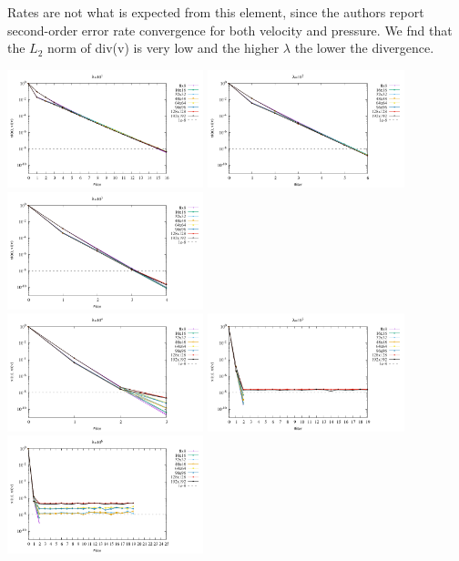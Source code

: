 Rates are not what is expected from this element, since the authors report 
second-order error rate convergence for both velocity and pressure.
We fnd that the $L_2$ norm of div(v) is very low and the higher $\lambda$ the lower 
the divergence.

\begin{center}
\includegraphics[width=5.7cm]{python_codes/fieldstone_161/results/bench1/iterations/conv1.pdf}
\includegraphics[width=5.7cm]{python_codes/fieldstone_161/results/bench1/iterations/conv2.pdf}
\includegraphics[width=5.7cm]{python_codes/fieldstone_161/results/bench1/iterations/conv3.pdf}\\
\includegraphics[width=5.7cm]{python_codes/fieldstone_161/results/bench1/iterations/conv4.pdf}
\includegraphics[width=5.7cm]{python_codes/fieldstone_161/results/bench1/iterations/conv5.pdf}
\includegraphics[width=5.7cm]{python_codes/fieldstone_161/results/bench1/iterations/conv6.pdf}
\end{center}

